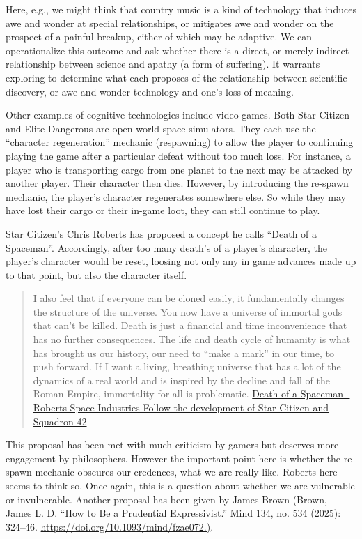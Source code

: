 \documentclass[
  letterpaper,
  DIV=11,
  numbers=noendperiod]{scrartcl}
\begin{document}
Here, e.g., we might think that country music is a kind of technology
that induces awe and wonder at special relationships, or mitigates awe
and wonder on the prospect of a painful breakup, either of which may be
adaptive. We can operationalize this outcome and ask whether there is a
direct, or merely indirect relationship between science and apathy (a
form of suffering). It warrants exploring to determine what each
proposes of the relationship between scientific discovery, or awe and
wonder technology and one's loss of meaning.

Other examples of cognitive technologies include video games. Both Star
Citizen and Elite Dangerous are open world space simulators. They each
use the ``character regeneration'' mechanic (respawning) to allow the
player to continuing playing the game after a particular defeat without
too much loss. For instance, a player who is transporting cargo from one
planet to the next may be attacked by another player. Their character
then dies. However, by introducing the re-spawn mechanic, the player's
character regenerates somewhere else. So while they may have lost their
cargo or their in-game loot, they can still continue to play.

Star Citizen's Chris Roberts has proposed a concept he calls ``Death of
a Spaceman''. Accordingly, after too many death's of a player's
character, the player's character would be reset, loosing not only any
in game advances made up to that point, but also the character itself.

\begin{quote}
I also feel that if everyone can be cloned easily, it fundamentally
changes the structure of the universe. You now have a universe of
immortal gods that can't be killed. Death is just a financial and time
inconvenience that has no further consequences. The life and death cycle
of humanity is what has brought us our history, our need to ``make a
mark'' in our time, to push forward. If I want a living, breathing
universe that has a lot of the dynamics of a real world and is inspired
by the decline and fall of the Roman Empire, immortality for all is
problematic.
\href{https://app.notion.com/p/Death-of-a-Spaceman-Roberts-Space-Industries-Follow-the-development-of-Star-Citizen-and-Squadron-34e8935bcf8a8133b234ea3311d7735b?pvs=21}{Death
of a Spaceman - Roberts Space Industries \textbar{} Follow the
development of Star Citizen and Squadron 42}
\end{quote}

This proposal has been met with much criticism by gamers but deserves
more engagement by philosophers. However the important point here is
whether the re-spawn mechanic obscures our credences, what we are really
like. Roberts here seems to think so. Once again, this is a question
about whether we are vulnerable or invulnerable. Another proposal has
been given by James Brown (Brown, James L. D. ``How to Be a Prudential
Expressivist.'' Mind 134, no. 534 (2025): 324--46.
\url{https://doi.org/10.1093/mind/fzae072.)}.
\end{document}
